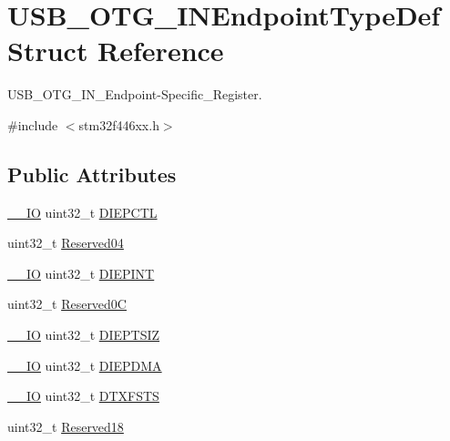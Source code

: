 \hypertarget{struct_u_s_b___o_t_g___i_n_endpoint_type_def}{}\section{U\+S\+B\+\_\+\+O\+T\+G\+\_\+\+I\+N\+Endpoint\+Type\+Def Struct Reference}
\label{struct_u_s_b___o_t_g___i_n_endpoint_type_def}


U\+S\+B\+\_\+\+O\+T\+G\+\_\+\+I\+N\+\_\+\+Endpoint-\/\+Specific\+\_\+\+Register.  




{\ttfamily \#include $<$stm32f446xx.\+h$>$}

\subsection*{Public Attributes}
\begin{DoxyCompactItemize}
\item 
\hyperlink{core__sc300_8h_aec43007d9998a0a0e01faede4133d6be}{\+\_\+\+\_\+\+IO} uint32\+\_\+t \hyperlink{struct_u_s_b___o_t_g___i_n_endpoint_type_def_a7ae9a62fb2acdc8981930ceb8ba5f100}{D\+I\+E\+P\+C\+TL}
\item 
uint32\+\_\+t \hyperlink{struct_u_s_b___o_t_g___i_n_endpoint_type_def_ab40b947e437eea142bb6682282b073d6}{Reserved04}
\item 
\hyperlink{core__sc300_8h_aec43007d9998a0a0e01faede4133d6be}{\+\_\+\+\_\+\+IO} uint32\+\_\+t \hyperlink{struct_u_s_b___o_t_g___i_n_endpoint_type_def_af66b4da67fb3732d6fd4f98dd0e9f824}{D\+I\+E\+P\+I\+NT}
\item 
uint32\+\_\+t \hyperlink{struct_u_s_b___o_t_g___i_n_endpoint_type_def_a30c3ab77aa3174965375dfe1a01bdddb}{Reserved0C}
\item 
\hyperlink{core__sc300_8h_aec43007d9998a0a0e01faede4133d6be}{\+\_\+\+\_\+\+IO} uint32\+\_\+t \hyperlink{struct_u_s_b___o_t_g___i_n_endpoint_type_def_aeda9700dcd52e252d7809cabed971bab}{D\+I\+E\+P\+T\+S\+IZ}
\item 
\hyperlink{core__sc300_8h_aec43007d9998a0a0e01faede4133d6be}{\+\_\+\+\_\+\+IO} uint32\+\_\+t \hyperlink{struct_u_s_b___o_t_g___i_n_endpoint_type_def_a8a7731263a0403b02e369ca387dce8e0}{D\+I\+E\+P\+D\+MA}
\item 
\hyperlink{core__sc300_8h_aec43007d9998a0a0e01faede4133d6be}{\+\_\+\+\_\+\+IO} uint32\+\_\+t \hyperlink{struct_u_s_b___o_t_g___i_n_endpoint_type_def_a2343fef0358d8713918d26eb93f1fa8b}{D\+T\+X\+F\+S\+TS}
\item 
uint32\+\_\+t \hyperlink{struct_u_s_b___o_t_g___i_n_endpoint_type_def_a525d6997cba563967fd7ea22898ed4f6}{Reserved18}
\end{DoxyCompactItemize}


